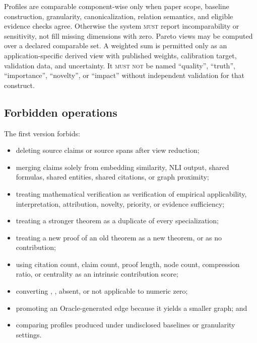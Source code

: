 Profiles are comparable component-wise only when paper scope, baseline construction, granularity, canonicalization, relation semantics, and eligible evidence checks agree. Otherwise the system \textsc{must} report incomparability or sensitivity, not fill missing dimensions with zero. Pareto views may be computed over a declared comparable set. A weighted sum is permitted only as an application-specific derived view with published weights, calibration target, validation data, and uncertainty. It \textsc{must not} be named ``quality'', ``truth'', ``importance'', ``novelty'', or ``impact'' without independent validation for that construct.

\subsection{Forbidden operations}

The first version forbids:
\begin{itemize}
  \item deleting source claims or source spans after view reduction;
  \item merging claims solely from embedding similarity, NLI output, shared formulas, shared entities, shared citations, or graph proximity;
  \item treating mathematical verification as verification of empirical applicability, interpretation, attribution, novelty, priority, or evidence sufficiency;
  \item treating a stronger theorem as a duplicate of every specialization;
  \item treating a new proof of an old theorem as a new theorem, or as no contribution;
  \item using citation count, claim count, proof length, node count, compression ratio, or centrality as an intrinsic contribution score;
  \item converting , , absent, or not applicable to numeric zero;
  \item promoting an Oracle-generated edge because it yields a smaller graph; and
  \item comparing profiles produced under undisclosed baselines or granularity settings.
\end{itemize}